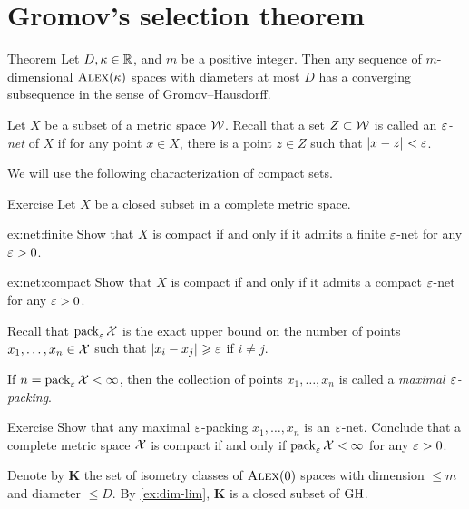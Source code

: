 \section{Gromov's selection theorem}

\begin{thm}{Theorem}\label{thm:gromov-compactness}
Let $D,\kappa\in\mathbb{R}$, and $m$ be a positive integer. 
Then any sequence of $m$-dimensional $\textsc{Alex}(\kappa)$ spaces with diameters at most $D$
has a converging subsequence in the sense of Gromov--Hausdorff.
\end{thm}

Let $X$ be a subset of a metric space $\mathcal{W}$.
Recall that a set $Z\subset \mathcal{W}$ is called an \emph{$\varepsilon$-net} of $X$ if for any point $x\in X$, there is a point $z\in Z$ such that $|{x}-{z}|_{}^{{}}<\varepsilon$.

We will use the following characterization of compact sets.

\begin{thm}{Exercise}\label{ex:net}
Let $X$ be a closed subset in a complete metric space.

\begin{subthm}{ex:net:finite}
Show that $X$ is compact if and only if it admits a finite $\varepsilon$-net for any $\varepsilon>0$.
\end{subthm}

\begin{subthm}{ex:net:compact}
Show that $X$ is compact if and only if it admits a compact $\varepsilon$-net for any $\varepsilon>0$.
\end{subthm}

\end{thm}

Recall that $\operatorname{\rm pack}\nolimits_\varepsilon\mathcal{X}$ is the exact upper bound on the number of points $x_1,\dots,x_n\in \mathcal{X}$ such that $|{x_i}-{x_j}|_{}^{{}}\geqslant\varepsilon$ if $i\ne j$.

If $n=\operatorname{\rm pack}\nolimits_\varepsilon\mathcal{X}<\infty$, then
the collection of points $x_1,\dots,x_n$ is called a \emph{maximal $\varepsilon$-packing}.

\begin{thm}{Exercise}\label{ex:pack-net}
Show that any maximal $\varepsilon$-packing $x_1,\dots,x_n$ is an $\varepsilon$-net.
Conclude that a complete metric space $\mathcal{X}$ is compact if and only if $\operatorname{\rm pack}\nolimits_\varepsilon\mathcal{X}<\infty$ for any $\varepsilon>0$.
\end{thm}


Denote by $\bm{K}$ the set of isometry classes of $\textsc{Alex}(0)$ spaces with dimension $\le m$ and diameter $\le D$.
By \ref{ex:dim-lim}, $\bm{K}$ is a closed subset of $\operatorname{\rm GH}\nolimits$.

